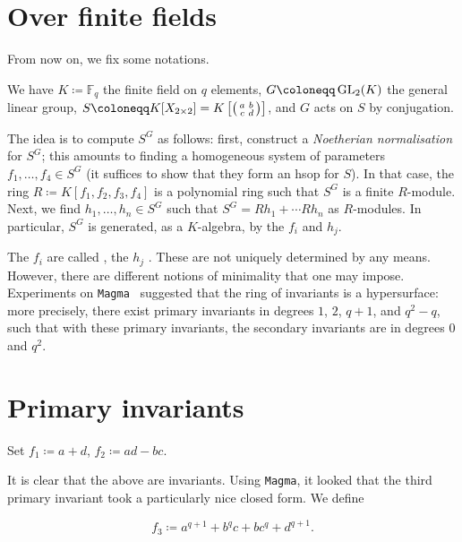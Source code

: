 \documentclass[12pt]{article}
\begin{document}
\section{Over finite fields}
	
	From now on, we fix some notations.
	\begin{tcolorbox}
		We have $K \coloneqq \mathbb{F}_{q}$ the finite field on $q$ elements, 
		$G \coloneqq \GL_{2}(K)$ the general linear group, 
		$S \coloneqq K[X_{2 \times 2}] = K\left[\smatrix{a & b \\ c & d}\right]$, 
		and $G$ acts on $S$ by conjugation. 
	\end{tcolorbox}

	The idea is to compute $S^{G}$ as follows: 
	first, construct a \emph{Noetherian normalisation} for $S^{G}$; this amounts to finding a homogeneous system of parameters $f_{1}, \ldots, f_{4} \in S^{G}$ (it suffices to show that they form an hsop for $S$). 
	In that case, the ring $R \coloneqq K[f_{1}, f_{2}, f_{3}, f_{4}]$ is a polynomial ring such that $S^{G}$ is a finite $R$-module. 
	Next, we find $h_{1}, \ldots, h_{n} \in S^{G}$ such that $S^{G} = R h_{1} + \cdots R h_{n}$ as $R$-modules. 
	In particular, $S^{G}$ is generated, as a $K$-algebra, by the $f_{i}$ and $h_{j}$.

	The $f_{i}$ are called , the $h_{j}$ . 
	These are not uniquely determined by any means. 
	However, there are different notions of minimality that one may impose. 
	Experiments on \texttt{Magma}~\Cite{Magma} suggested that the ring of invariants is a hypersurface: more precisely, there exist primary invariants in degrees $1$, $2$, $q+1$, and $q^{2} - q$, such that with these primary invariants, the secondary invariants are in degrees $0$ and $q^{2}$.

\section{Primary invariants}
	
	\begin{tcolorbox}
		Set $f_{1} \coloneqq a + d$, $f_{2} \coloneqq ad - bc$.
	\end{tcolorbox}

	It is clear that the above are invariants. 
	Using \texttt{Magma}, it looked that the third primary invariant took a particularly nice closed form.
	We define
	\begin{tcolorbox}
		\begin{equation*} 
			f_{3} \coloneqq a^{q + 1} + b^{q} c + b c^{q} + d^{q + 1}.
		\end{equation*}
	\end{tcolorbox}
\end{document}
